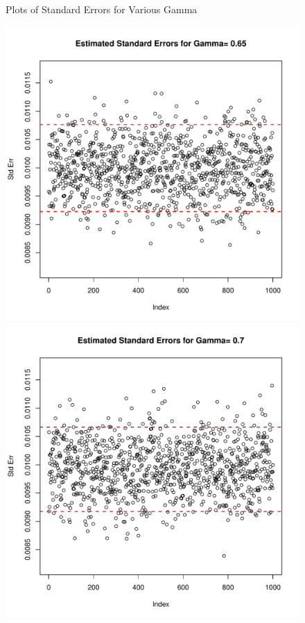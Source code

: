 \documentclass[a4paper, 11pt]{report}
\begin{document}
\begin{enumerate}
\begin{figure}[H]
				\caption{Plots of Standard Errors for Various Gamma}
				\label{gammaplot1}
			\end{figure}
			\newpage
			\begin{figure}[H]
				\centering
				\includegraphics[scale=0.50]{index_plot_se_s5_r50_g65.pdf} 
				\includegraphics[scale=0.50]{index_plot_se_s5_r50_g70.pdf} \\				

\end{figure}
\end{enumerate}
\end{document}
